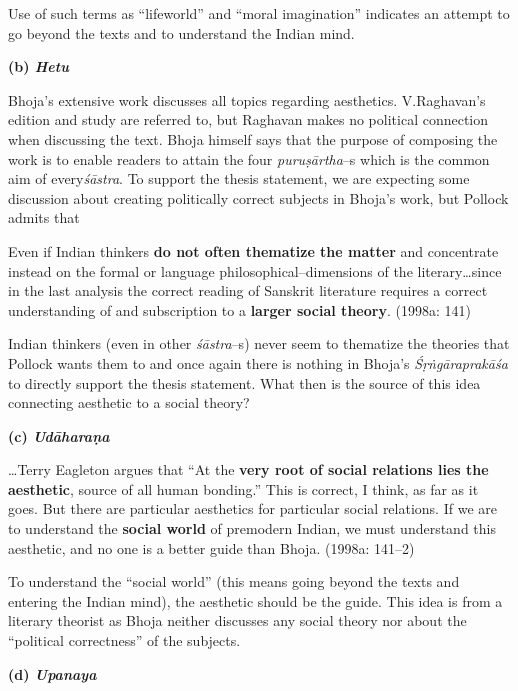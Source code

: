 Use of such terms as “lifeworld” and “moral imagination” indicates an attempt to go beyond the texts and to understand the Indian mind.

\textbf{(b) \textit{Hetu}}

Bhoja’s extensive work discusses all topics regarding aesthetics. V.Raghavan’s edition and study are referred to, but Raghavan makes no political connection when discussing the text. Bhoja himself says that the purpose of composing the work is to enable readers to attain the four \textit{puruṣārtha}–s which is the common aim of every\textit{śāstra}. To support the thesis statement, we are expecting some discussion about creating politically correct subjects in Bhoja’s work, but Pollock admits that

\begin{myquote}
Even if Indian thinkers \textbf{do not often thematize the matter} and concentrate instead on the formal or language philosophical–dimensions of the literary…since in the last analysis the correct reading of Sanskrit literature requires a correct understanding of and subscription to a \textbf{larger social theory}. (1998a: 141)
\end{myquote}

Indian thinkers (even in other \textit{śāstra}–s) never seem to thematize the theories that Pollock wants them to and once again there is nothing in Bhoja’s \textit{Śṛṅgāraprakāśa} to directly support the thesis statement. What then is the source of this idea connecting aesthetic to a social theory?

\textbf{(c) \textit{Udāharaṇa}}

\begin{myquote}
…Terry Eagleton argues that “At the \textbf{very root of social relations lies the aesthetic}, source of all human bonding.” This is correct, I think, as far as it goes. But there are particular aesthetics for particular social relations. If we are to understand the \textbf{social world} of premodern Indian, we must understand this aesthetic, and no one is a better guide than Bhoja. (1998a: 141–2)
\end{myquote}

To understand the “social world” (this means going beyond the texts and entering the Indian mind), the aesthetic should be the guide. This idea is from a literary theorist as Bhoja neither discusses any social theory nor about the “political correctness” of the subjects.

\textbf{(d) \textit{Upanaya}}

